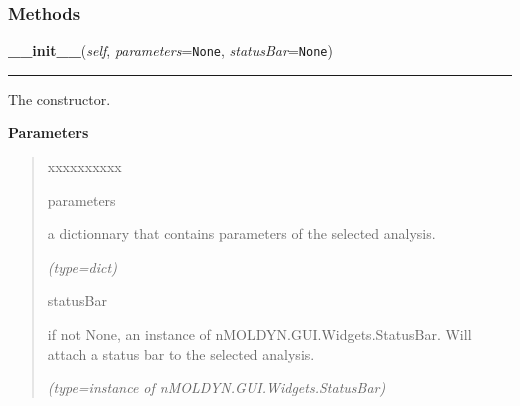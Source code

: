   \subsubsection{Methods}

    \label{nMOLDYN:Analysis:Analysis:Analysis:__init__}

    \vspace{0.5ex}

\hspace{.8\funcindent}\begin{boxedminipage}{\funcwidth}

    \raggedright \textbf{\_\_init\_\_}(\textit{self}, \textit{parameters}={\tt None}, \textit{statusBar}={\tt None})

    \vspace{-1.5ex}

    \rule{\textwidth}{0.5\fboxrule}
\setlength{\parskip}{2ex}
    The constructor.

\setlength{\parskip}{1ex}
      \textbf{Parameters}
      \vspace{-1ex}

      \begin{quote}
        \begin{Ventry}{xxxxxxxxxx}

          \item[parameters]

          a dictionnary that contains parameters of the selected analysis.

            {\it (type=dict)}

          \item[statusBar]

          if not None, an instance of nMOLDYN.GUI.Widgets.StatusBar. Will 
          attach a status bar to the selected analysis.

            {\it (type=instance of nMOLDYN.GUI.Widgets.StatusBar)}

        \end{Ventry}

      \end{quote}

    \end{boxedminipage}

    \label{nMOLDYN:Analysis:Analysis:Analysis:setInputParameters}

